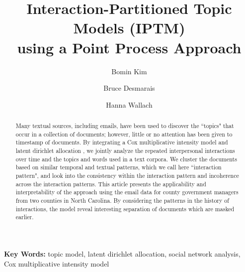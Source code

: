 \documentclass[a4paper]{article}
\title{Interaction-Partitioned Topic Models (IPTM) \\using a Point Process Approach}
\author[1]{Bomin Kim}
\author[1]{Bruce Desmarais}
\author[2,3]{Hanna Wallach}
\affil[1]{Pennsylvania State University}
\affil[2]{Microsoft Research NYC}
\affil[3]{University of Massachusetts Amherst}
\begin{document}
\maketitle
\begin{abstract}
Many textual sources, including emails, have been used to discover the ``topics" that occur in a collection of documents; however, little or no attention has been given to timestamp of documents. By integrating a Cox multiplicative intensity model \citep{PerryWolfe2012} and latent dirichlet allocation \citep{Blei2003},  we jointly analyze the repeated interpersonal interactions over time and the topics and words used in a text corpora. We cluster the documents based on similar temporal and textual patterns, which we call here ``interaction pattern", and look into the consistency within the interaction pattern and incoherence across the interaction patterns. This article presents the applicability and interpretability of the approach using the email data for county government managers from two counties in North Carolina. By considering the patterns in the history of interactions, the model reveal interesting separation of documents which are masked earlier. 
\end{abstract}
\textbf{Key Words:} topic model, latent dirichlet allocation, social network analysis, Cox multiplicative intensity model
\end{document}
